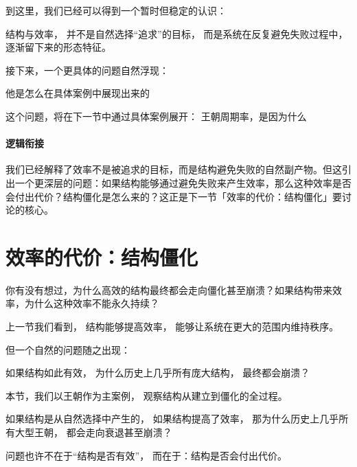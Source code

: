 \documentclass[../main.tex]{subfiles}
\begin{document}

\begin{readingnote}
	到这里，我们已经可以得到一个暂时但稳定的认识：
	
	结构与效率，
	并不是自然选择“追求”的目标，
	而是系统在反复避免失败过程中，
	逐渐留下来的形态特征。
	
	接下来，一个更具体的问题自然浮现：
	
	他是怎么在具体案例中展现出来的
\end{readingnote}

这个问题，将在下一节中通过具体案例展开：
王朝周期率，是因为什么

\paragraph*{逻辑衔接}
我们已经解释了效率不是被追求的目标，而是结构避免失败的自然副产物。但这引出一个更深层的问题：如果结构能够通过避免失败来产生效率，那么这种效率是否会付出代价？结构僵化是怎么来的？这正是下一节「效率的代价：结构僵化」要讨论的核心。

\section{效率的代价：结构僵化} \label{sec:rigidity}

\begin{readingnote}
	你有没有想过，为什么高效的结构最终都会走向僵化甚至崩溃？如果结构带来效率，为什么这种效率不能永久持续？
\end{readingnote}

上一节我们看到，
结构能够提高效率，
能够让系统在更大的范围内维持秩序。

但一个自然的问题随之出现：

\begin{questionbox}
	如果结构如此有效，
	为什么历史上几乎所有庞大结构，
	最终都会崩溃？
\end{questionbox}

本节，我们以王朝作为主案例，
观察结构从建立到僵化的全过程。

\begin{motivation}
	如果结构是从自然选择中产生的，
	如果结构提高了效率，
	那为什么历史上几乎所有大型王朝，
	都会走向衰退甚至崩溃？
	
	问题也许不在于“结构是否有效”，
	而在于：结构是否会付出代价。
\end{motivation}

\end{document}

